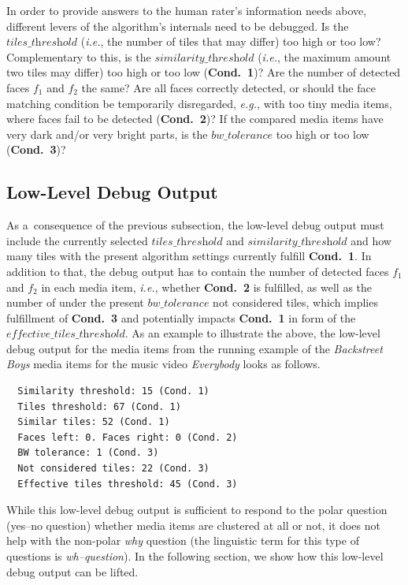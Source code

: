 \documentclass{article}
\begin{document}
In order to provide answers to the human rater's information needs above,
different levers of the algorithm's internals need to be debugged.
Is the $\textit{tiles\_threshold}$
(\emph{i.e.}, the number of tiles that may differ)
too high or too low?
Complementary to this, is the $\textit{similarity\_threshold}$
(\emph{i.e.}, the maximum amount two tiles may differ)
too high or too low (\textbf{Cond.~1})?
Are the number of detected faces $f_1$ and $f_2$ the same?
Are all faces correctly detected,
or should the face matching condition be temporarily disregarded,
\emph{e.g.}, with too tiny media items,
where faces fail to be detected (\textbf{Cond.~2})?
If the compared media items have very dark and/or very bright parts,
is the $\textit{bw\_tolerance}$ too high or too low (\textbf{Cond.~3})?

\subsection{Low-Level Debug Output}
\label{sec:low-level-debug-output}

As a~consequence of the previous subsection,
the low-level debug output must include
the currently selected $\textit{tiles\_threshold}$ and
$\textit{similarity\_threshold}$ and how many tiles
with the present algorithm settings currently fulfill \textbf{Cond.~1}.
In addition to that, the debug output has to contain
the number of detected faces $f_1$ and $f_2$
in each media item, \emph{i.e.}, whether \textbf{Cond.~2} is fulfilled,
as well as the number of under the present $\textit{bw\_tolerance}$
not considered tiles, which implies fulfillment of \textbf{Cond.~3}
and potentially impacts \textbf{Cond.~1}
in form of the $\textit{effective\_tiles\_threshold}$.
As an example to illustrate the above,
the low-level debug output for the media items
from the running example of the \emph{Backstreet Boys} media items
for the music video \emph{Everybody} looks as follows.

\begin{verbatim}
  Similarity threshold: 15 (Cond. 1)
  Tiles threshold: 67 (Cond. 1)
  Similar tiles: 52 (Cond. 1)
  Faces left: 0. Faces right: 0 (Cond. 2)
  BW tolerance: 1 (Cond. 3)
  Not considered tiles: 22 (Cond. 3)
  Effective tiles threshold: 45 (Cond. 3)
\end{verbatim}

While this low-level debug output is sufficient to respond to the polar question
(yes--no question) whether media items are clustered at all or not,
it does not help with the non-polar \emph{why} question
(the linguistic term for this type of questions is \emph{wh--question}).
In the following section, we show how this low-level debug output can be lifted.
\end{document}
